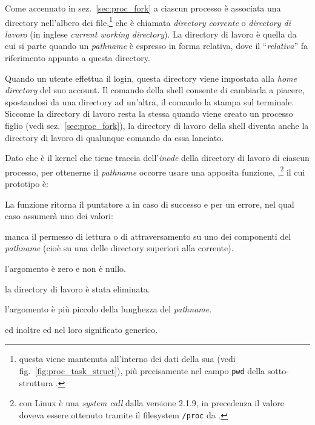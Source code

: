 
Come accennato in sez.~\ref{sec:proc_fork} a ciascun processo è associata una
directory nell'albero dei file,\footnote{questa viene mantenuta all'interno
  dei dati della sua  (vedi
  fig.~\ref{fig:proc_task_struct}), più precisamente nel campo \texttt{pwd}
  della sotto-struttura .} che è chiamata
\textsl{directory corrente} o \textsl{directory di lavoro} (in inglese
\textit{current working directory}).  La directory di lavoro è quella da cui
si parte quando un \textit{pathname} è espresso in forma relativa, dove il
``\textsl{relativa}'' fa riferimento appunto a questa directory.

Quando un utente effettua il login, questa directory viene impostata alla
\textit{home directory} del suo account. Il comando  della shell
consente di cambiarla a piacere, spostandosi da una directory ad un'altra, il
comando  la stampa sul terminale.  Siccome la directory di lavoro
resta la stessa quando viene creato un processo figlio (vedi
sez.~\ref{sec:proc_fork}), la directory di lavoro della shell diventa anche la
directory di lavoro di qualunque comando da essa lanciato.

Dato che è il kernel che tiene traccia dell'\textit{inode} della directory di
lavoro di ciascun processo, per ottenerne il \textit{pathname} occorre usare
una apposita funzione, ,\footnote{con Linux  è una
  \textit{system call} dalla versione 2.1.9, in precedenza il valore doveva
  essere ottenuto tramite il filesystem \texttt{/proc} da
  .} il cui prototipo è:

\begin{funcproto}{
}
{La funzione ritorna il puntatore a  in caso di successo e
   per un errore, nel qual caso  assumerà uno dei valori: 
  \begin{errlist}
  \item[\errcode{EACCES}] manca il permesso di lettura o di attraversamento  su
    uno dei componenti del \textit{pathname} (cioè su una delle directory
    superiori alla corrente).
  \item[\errcode{EINVAL}] l'argomento  è zero e  non
    è nullo.
  \item[\errcode{ENOENT}] la directory di lavoro è stata eliminata. 
  \item[\errcode{ERANGE}] l'argomento  è più piccolo della
    lunghezza del \textit{pathname}. 
  \end{errlist}
  ed inoltre  ed  nel loro significato
  generico.}
\end{funcproto}

